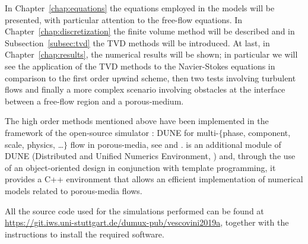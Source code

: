 In Chapter~\ref{chap:equations} the equations employed in the models will be 
presented, with particular attention to the free-flow equations. In 
Chapter~\ref{chap:discretization} the finite volume method will be described 
and in Subsection~\ref{subsec:tvd} the TVD methods will be introduced. At last, 
in Chapter~\ref{chap:results}, the numerical results will be shown; in 
particular we will see the application of the TVD methods to the Navier-Stokes 
equations in comparison to the first order upwind scheme, then two tests 
involving turbulent flows and finally a more complex scenario involving 
obstacles at the interface between a free-flow region and a porous-medium.

The high order methods mentioned above have been implemented in the framework 
of the open-source simulator \DUMUX: DUNE for multi-$\{$phase, component, 
scale, physics, \dots$\}$ flow in porous-media, see \cite{dumux:tutti} and 
\cite{dumux:flemisch}. \DUMUX is an 
additional module of DUNE (Distributed and Unified Numerics Environment, 
\cite{web:dune}) and, through the use of an object-oriented design in 
conjunction with template programming, it provides a C++ environment that 
allows an efficient implementation of numerical models related to porous-media 
flows.

All the source code used for the simulations performed can be 
found at \url{https://git.iws.uni-stuttgart.de/dumux-pub/vescovini2019a}, 
together with the instructions to install the required software.